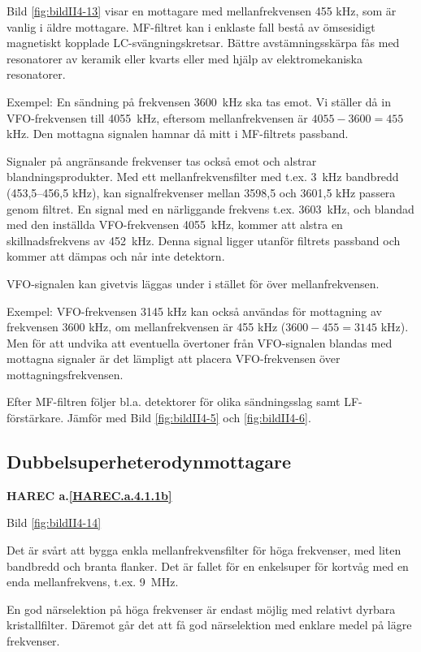 Bild \ref{fig:bildII4-13} visar en mottagare med mellanfrekvensen 455 kHz,
som är vanlig i äldre mottagare. MF-filtret kan i enklaste fall bestå av
ömsesidigt magnetiskt kopplade LC-svängningskretsar. Bättre
avstämningsskärpa fås med resonatorer av keramik eller kvarts eller med
hjälp av elektromekaniska resonatorer.

Exempel: En sändning på frekvensen 3600~kHz ska tas emot. Vi ställer
då in VFO-frekvensen till 4055~kHz, eftersom mellanfrekvensen är
\(4055 - 3600 = 455\) kHz. Den mottagna signalen hamnar då mitt i
MF-filtrets passband.

Signaler på angränsande frekvenser tas också emot och alstrar
blandningsprodukter.  Med ett mellanfrekvensfilter med t.ex. 3~kHz
bandbredd (453,5--456,5 kHz), kan signalfrekvenser mellan 3598,5 och
3601,5 kHz passera genom filtret. En signal med en närliggande
frekvens t.ex. 3603~kHz, och blandad med den inställda VFO-frekvensen
4055~kHz, kommer att alstra en skillnadsfrekvens av 452~kHz. Denna
signal ligger utanför filtrets passband och kommer att dämpas och når
inte detektorn.

VFO-signalen kan givetvis läggas under i stället för över
mellanfrekvensen.

Exempel: VFO-frekvensen 3145 kHz kan också användas för mottagning av
frekvensen 3600 kHz, om mellanfrekvensen är 455 kHz (\(3600 - 455 =
3145\) kHz). Men för att undvika att eventuella övertoner från
VFO-signalen blandas med mottagna signaler är det lämpligt att placera
VFO-frekvensen över mottagningsfrekvensen.

Efter MF-filtren följer bl.a. detektorer för olika sändningsslag samt
LF-förstärkare.  Jämför med Bild \ref{fig:bildII4-5} och \ref{fig:bildII4-6}.

\subsection{Dubbelsuperheterodynmottagare}
\textbf{HAREC a.\ref{HAREC.a.4.1.1b}\label{myHAREC.a.4.1.1b}}

Bild \ref{fig:bildII4-14}

Det är svårt att bygga enkla mellanfrekvensfilter för höga frekvenser,
med liten bandbredd och branta flanker. Det är fallet för en
enkelsuper för kortvåg med en enda mellanfrekvens, t.ex. 9~MHz.

En god närselektion på höga frekvenser är endast möjlig med relativt
dyrbara kristallfilter. Däremot går det att få god närselektion med
enklare medel på lägre frekvenser.

